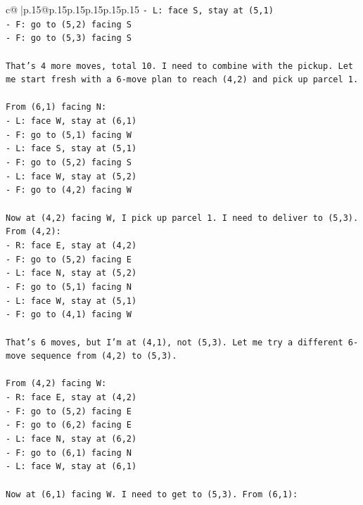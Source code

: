 \documentclass{article}
\begin{document}
{\begin{supertabular}{c@{$\;$}|p{.15\linewidth}@{}p{.15\linewidth}p{.15\linewidth}p{.15\linewidth}p{.15\linewidth}p{.15\linewidth}}
{{{\texttt{{-} L: face S, stay at (5,1)} \\
\texttt{{-} F: go to (5,2) facing S} \\
\texttt{{-} F: go to (5,3) facing S} \\
\\ 
\texttt{That's 4 more moves, total 10. I need to combine with the pickup. Let me start fresh with a 6{-}move plan to reach (4,2) and pick up parcel 1.} \\
\\ 
\texttt{From (6,1) facing N:} \\
\texttt{{-} L: face W, stay at (6,1)} \\
\texttt{{-} F: go to (5,1) facing W} \\
\texttt{{-} L: face S, stay at (5,1)} \\
\texttt{{-} F: go to (5,2) facing S} \\
\texttt{{-} L: face W, stay at (5,2)} \\
\texttt{{-} F: go to (4,2) facing W} \\
\\ 
\texttt{Now at (4,2) facing W, I pick up parcel 1. I need to deliver to (5,3). From (4,2):} \\
\texttt{{-} R: face E, stay at (4,2)} \\
\texttt{{-} F: go to (5,2) facing E} \\
\texttt{{-} L: face N, stay at (5,2)} \\
\texttt{{-} F: go to (5,1) facing N} \\
\texttt{{-} L: face W, stay at (5,1)} \\
\texttt{{-} F: go to (4,1) facing W} \\
\\ 
\texttt{That's 6 moves, but I'm at (4,1), not (5,3). Let me try a different 6{-}move sequence from (4,2) to (5,3).} \\
\\ 
\texttt{From (4,2) facing W:} \\
\texttt{{-} R: face E, stay at (4,2)} \\
\texttt{{-} F: go to (5,2) facing E} \\
\texttt{{-} F: go to (6,2) facing E} \\
\texttt{{-} L: face N, stay at (6,2)} \\
\texttt{{-} F: go to (6,1) facing N} \\
\texttt{{-} L: face W, stay at (6,1)} \\
\\ 
\texttt{Now at (6,1) facing W. I need to get to (5,3). From (6,1):} \\
}}}
\end{supertabular}}
\end{document}
